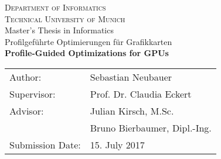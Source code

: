 \newpage
\begin{center}
  \vspace*{3cm}

  \vspace*{0.5cm}
  {\huge \textsc{Department of Informatics}}\\
  \vspace{0.25cm}
  {\Large \textsc{Technical University of Munich}} \\
  \vspace*{2cm}
  {\large Master's Thesis in Informatics} \\
  \vspace*{1cm}
  {\huge Profilgeführte Optimierungen für Grafikkarten} \\
  \vspace*{1cm}
  {\huge \textbf{Profile-Guided Optimizations for GPUs} \\}
  \vspace*{2.5cm}
  {\large
  \begin{tabular}{ll}
  Author:         & Sebastian Neubauer  \\
  Supervisor:     & Prof. Dr. Claudia Eckert \\
  Advisor:        & Julian Kirsch, M.Sc. \\
                  & Bruno Bierbaumer, Dipl.-Ing. \\
  Submission Date:& 15. July 2017
  \end{tabular}
  }
\end{center}
